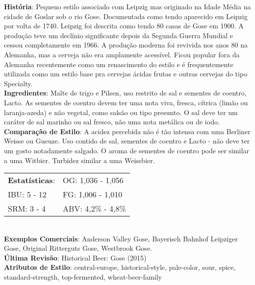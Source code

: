 \textbf{História}: Pequeno estilo associado com Leipzig mas originado na Idade Média na cidade de Goslar sob o rio Gose. Documentada como tendo aparecido em Leipzig por volta de 1740. Leipzig foi descrita como tendo 80 casas de Gose em 1900. A produção teve um declínio significante depois da Segunda Guerra Mundial e cessou completamente em 1966. A produção moderna foi revivida nos anos 80 na Alemanha, mas a cerveja não era amplamente acessível. Ficou popular fora da Alemanha recentemente como um renascimento do estilo e é frequentemente utilizada como um estilo base pra cervejas ácidas frutas e outras cervejas do tipo Specialty. \\
\textbf{Ingredientes}: Malte de trigo e Pilsen, uso restrito de sal e sementes de coentro, Lacto. As sementes de coentro devem ter uma nota viva, fresca, cítrica (limão ou laranja-azeda) e não vegetal, como salsão ou tipo presunto. O sal deve ter um caráter de sal marinho ou sal fresco, não uma nota metálica ou de iodo. \\
\textbf{Comparação de Estilo}: A acidez percebida não é tão intensa com uma Berliner Weisse ou Gueuze. Uso contido de sal, sementes de coentro e Lacto - não deve ter um gosto notadamente salgado. O aroma de sementes de coentro pode ser similar a uma Witbier. Turbidez similar a uma Weissbier. \\
\begin{tabular}{@{}p{35mm}p{35mm}@{}}
  \textbf{Estatísticas}: & OG: 1,036 - 1,056 \\
  IBU: 5 - 12  & FG: 1,006 - 1,010  \\
  SRM: 3 - 4  & ABV: 4,2\% - 4,8\%
\end{tabular}\\
\textbf{Exemplos Comerciais}: Anderson Valley Gose, Bayerisch Bahnhof Leipziger Gose, Original Ritterguts Gose, Westbrook Gose. \\
\textbf{Última Revisão}: Historical Beer: Gose (2015) \\
\textbf{Atributos de Estilo}: central-europe, historical-style, pale-color, sour, spice, standard-strength, top-fermented, wheat-beer-family
